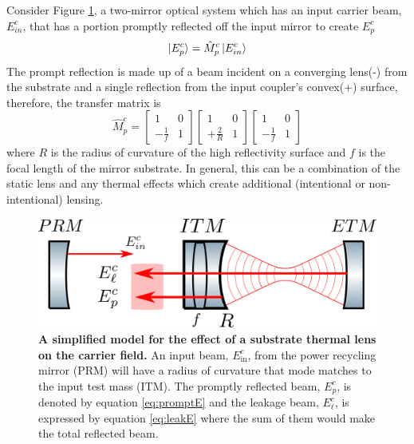 		Consider Figure \ref{fig:ThermalLensFP}, a two-mirror optical system which has an input carrier beam, $E^c_{in}$, that has a portion promptly reflected off the input mirror to create $E^c_{p}$
		\begin{equation}
		\ket{E^{c}_{p}} = \hat{M}^{c}_{p} \ket{E^{c}_{in}}
		\end{equation}
		The prompt reflection is made up of a beam incident on a converging lens(-) from the substrate and a single reflection from the input coupler's convex(+) surface, therefore, the transfer matrix is
		\begin{equation}
		\hat{M}^{c}_{p} = 
		\begin{bmatrix}
						1 	&	0 
		\\ 	-\frac{1}{f} 	&	1
		\end{bmatrix}
		\begin{bmatrix}
						1 	&	0 
		\\ 	+\frac{2}{R} 	&	1
		\end{bmatrix}
		\begin{bmatrix}
						1 	&	0 
		\\ 	-\frac{1}{f} 	&	1
		\end{bmatrix}
		\end{equation}
		where $R$ is the radius of curvature of the high reflectivity surface and $f$ is the focal length of the mirror substrate. In general, this can be a combination of the static lens and any thermal effects which create additional (intentional or non-intentional) lensing.
		
		\begin{figure}[ht]
			\centering
			\includegraphics[width=.7 \textwidth]{../Figures/ThermalLensFP.png}
			\caption[A simplified model for the effect of a substrate thermal lens on the carrier field.]  
			{\textbf{A simplified model for the effect of a substrate thermal lens on the carrier field.} An input beam, $E_{\text{in}}^{c}$, from the power recycling mirror (PRM) will have a radius of curvature that mode matches to the input test mass (ITM).  The promptly reflected beam, $E_{p}^{c}$, is denoted by equation \ref{eq:promptE} and the leakage beam, $E_{\ell}^{c}$, is expressed by equation \ref{eq:leakE} where the sum of them would make the total reflected beam.}
				\label{fig:ThermalLensFP}
		\end{figure}
		
